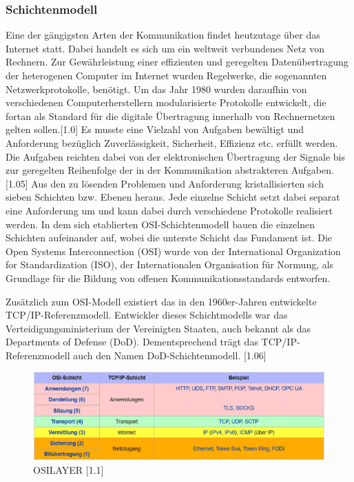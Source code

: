 \subsubsection{Schichtenmodell}

Eine der gängigsten Arten der Kommunikation findet heutzutage über das Internet statt. 
Dabei handelt es sich um ein weltweit verbundenes Netz von Rechnern. Zur Gewährleistung einer effizienten und geregelten Datenübertragung der heterogenen Computer im Internet wurden Regelwerke, die sogenannten Netzwerkprotokolle, benötigt.
Um das Jahr 1980 wurden daraufhin von verschiedenen Computerherstellern modularisierte Protokolle entwickelt, die fortan als Standard für die digitale Übertragung innerhalb von Rechnernetzen gelten sollen.[1.0] 
Es musste eine Vielzahl von Aufgaben bewältigt und Anforderung bezüglich Zuverlässigkeit, Sicherheit, Effizienz etc. erfüllt werden. Die Aufgaben reichten dabei von der elektronischen Übertragung der Signale bis zur geregelten Reihenfolge der in der Kommunikation abstrakteren Aufgaben.[1.05] 
Aus den zu lösenden Problemen und Anforderung kristallisierten sich sieben Schichten bzw. Ebenen heraus. 
Jede einzelne Schicht setzt dabei separat eine Anforderung um und kann dabei durch verschiedene Protokolle realisiert werden. In dem sich etablierten OSI-Schichtenmodell bauen die einzelnen Schichten aufeinander auf, wobei die unterste Schicht das Fundament ist. 
Die Open Systems Interconnection (OSI) wurde von der International Organization for Standardization (ISO), der Internationalen Organisation für Normung, als Grundlage für die Bildung von offenen Kommunikationsstandards entworfen. 
\newline

Zusätzlich zum OSI-Modell existiert das in den 1960er-Jahren entwickelte TCP/IP-Referenz\-modell. Entwickler dieses Schichtmodells war das Verteidigungsministerium der Vereinigten Staaten, auch bekannt als das Departments of Defense (DoD). Dementsprechend trägt das TCP/IP-Referenzmodell auch den Namen DoD-Schichtenmodell. [1.06]

\begin{figure}[h]
\centering
\includegraphics[width=\textwidth]{images/Netzwerkprotokolle_OSI-Schicht.PNG}
\caption{OSILAYER [1.1]}
\end{figure}

